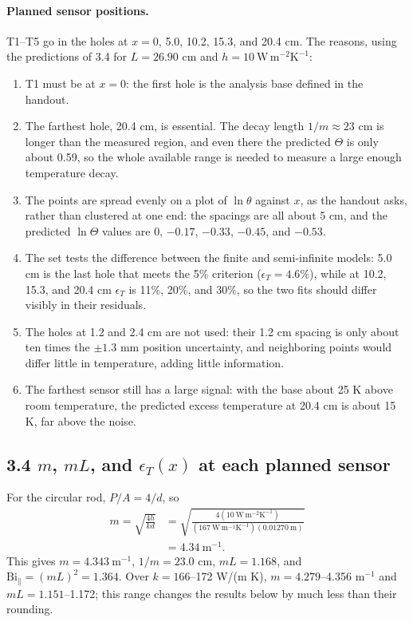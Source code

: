 \documentclass[reprint, amsmath, amssymb, aps, prl]{revtex4-2}
\newcommand{\WmK}{\mathrm{W\,m^{-1}K^{-1}}}
\newcommand{\WmmK}{\mathrm{W\,m^{-2}K^{-1}}}
\begin{document}
\paragraph*{Planned sensor positions.}
T1--T5 go in the holes at $x=0$, 5.0, 10.2, 15.3, and 20.4 cm. The reasons, using the
predictions of 3.4 for $L=26.90$ cm and $h=10~\WmmK$:
\begin{enumerate}
\item T1 must be at $x=0$: the first hole is the analysis base defined in the handout.
\item The farthest hole, 20.4 cm, is essential. The decay length $1/m\approx23$ cm is
longer than the measured region, and even there the predicted $\Theta$ is only about 0.59,
so the whole available range is needed to measure a large enough temperature decay.
\item The points are spread evenly on a plot of $\ln\theta$ against $x$, as the handout
asks, rather than clustered at one end: the spacings are all about 5 cm, and the
predicted $\ln\Theta$ values are 0, $-0.17$, $-0.33$, $-0.45$, and $-0.53$.
\item The set tests the difference between the finite and semi-infinite models: 5.0 cm is
the last hole that meets the 5\% criterion ($\epsilon_T=4.6\%$), while at 10.2, 15.3, and
20.4 cm $\epsilon_T$ is 11\%, 20\%, and 30\%, so the two fits should differ visibly in
their residuals.
\item The holes at 1.2 and 2.4 cm are not used: their 1.2 cm spacing is only about ten
times the $\pm1.3$ mm position uncertainty, and neighboring points would differ little in
temperature, adding little information.
\item The farthest sensor still has a large signal: with the base about 25 K above room
temperature, the predicted excess temperature at 20.4 cm is about 15 K, far above the
noise.
\end{enumerate}

\subsection*{3.4 $m$, $mL$, and $\epsilon_T(x)$ at each planned sensor}

For the circular rod, $P/A=4/d$, so
\begin{align*}
m=\sqrt{\frac{4h}{kd}}
&=\sqrt{\frac{4(10~\WmmK)}{(167~\WmK)(0.01270~\mathrm{m})}}\\
&=4.34~\mathrm{m^{-1}}.
\end{align*}
This gives $m=4.343~\mathrm{m^{-1}}$, $1/m=23.0$ cm, $mL=1.168$, and
$\mathrm{Bi}_\parallel=(mL)^2=1.364$. Over $k=166$--172 W/(m K), $m=4.279$--4.356
$\mathrm{m^{-1}}$ and $mL=1.151$--1.172; this range changes the results below by much
less than their rounding.
\end{document}
